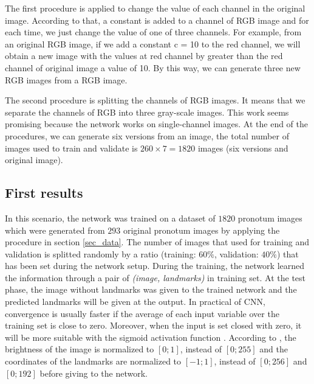 \documentclass[10pt]{article}
\begin{document}
The first procedure is applied to change the value of each
channel in the original image. According to that, a constant is
added to a channel of RGB image and for each time, we just
change the value of one of three channels. For example, from
an original RGB image, if we add a constant c = 10 to the
red channel, we will obtain a new image with the values at
red channel by greater than the red channel of original image
a value of 10. By this way, we can generate three new RGB
images from a RGB image.

The second procedure is splitting the channels of RGB
images. It means that we separate the channels of RGB into
three gray-scale images. This work seems promising because
the network works on single-channel images. At the end of the procedures, we
can generate six versions from an image, the total number of
images used to train and validate is $260 \times 7 = 1820$ images
(six versions and original image).


\subsection{First results}
\label{sectrain1}
In this scenario, the network was trained on a dataset of $1820$ pronotum images which were generated from $293$ original pronotum images by applying the procedure in section \ref{sec_data}. The number of images that
used for training and validation is splitted randomly by a ratio
(training: $60\%$, validation: $40\%$) that has been set during the
network setup. During the training, the network learned the information through a pair of \textit{(image, landmarks)} in training set. At the test phase, the image without landmarks was given to the trained network and the predicted landmarks will be given at the output. In practical of CNN, convergence is
usually faster if the average of each input variable over the
training set is close to zero. Moreover, when the input is set
closed with zero, it will be more suitable with the sigmoid
activation function \cite{lecun2012efficient}. According to \cite{lecun2012efficient}, the brightness of
the image is normalized to $[0; 1]$, instead of $[0; 255]$ and the
coordinates of the landmarks are normalized to $[-1; 1]$, instead
of $[0; 256]$ and $[0; 192]$ before giving to the network.
\end{document}
